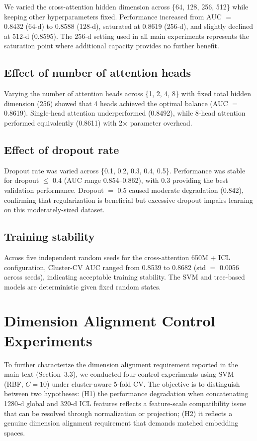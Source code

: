 \documentclass[11pt,a4paper]{article}
\begin{document}
We varied the cross-attention hidden dimension across \{64, 128, 256, 512\} while keeping other hyperparameters fixed. Performance increased from AUC $=$ 0.8432 (64-d) to 0.8588 (128-d), saturated at 0.8619 (256-d), and slightly declined at 512-d (0.8595). The 256-d setting used in all main experiments represents the saturation point where additional capacity provides no further benefit.

\subsection{Effect of number of attention heads}

Varying the number of attention heads across \{1, 2, 4, 8\} with fixed total hidden dimension (256) showed that 4 heads achieved the optimal balance (AUC $=$ 0.8619). Single-head attention underperformed (0.8492), while 8-head attention performed equivalently (0.8611) with 2$\times$ parameter overhead.

\subsection{Effect of dropout rate}

Dropout rate was varied across \{0.1, 0.2, 0.3, 0.4, 0.5\}. Performance was stable for dropout $\le$ 0.4 (AUC range 0.854--0.862), with 0.3 providing the best validation performance. Dropout $=$ 0.5 caused moderate degradation (0.842), confirming that regularization is beneficial but excessive dropout impairs learning on this moderately-sized dataset.

\subsection{Training stability}

Across five independent random seeds for the cross-attention 650M + ICL configuration, Cluster-CV AUC ranged from 0.8539 to 0.8682 (std $=$ 0.0056 across seeds), indicating acceptable training stability. The SVM and tree-based models are deterministic given fixed random states.

\section{Dimension Alignment Control Experiments}

To further characterize the dimension alignment requirement reported in the main text (Section~3.3), we conducted four control experiments using SVM (RBF, $C=10$) under cluster-aware 5-fold CV. The objective is to distinguish between two hypotheses: (H1) the performance degradation when concatenating 1280-d global and 320-d ICL features reflects a feature-scale compatibility issue that can be resolved through normalization or projection; (H2) it reflects a genuine dimension alignment requirement that demands matched embedding spaces.
\end{document}
